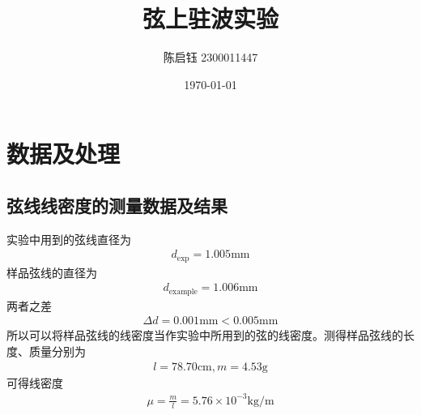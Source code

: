 \documentclass{ctexart}
\title{弦上驻波实验}
\author{陈启钰\,\,2300011447}
\date{\today}
\begin{document}
	\maketitle
	\section{数据及处理}
	\subsection{弦线线密度的测量数据及结果}
	实验中用到的弦线直径为
	\begin{align}
		d_\text{exp}=1.005\mathrm{mm}
	\end{align}
	样品弦线的直径为
	\begin{align}
		d_\text{example}=1.006\mathrm{mm}
	\end{align}
	两者之差
	\begin{align}
		\Delta d=0.001\mathrm{mm}<0.005\mathrm{mm}
	\end{align}
	所以可以将样品弦线的线密度当作实验中所用到的弦的线密度。测得样品弦线的长度、质量分别为
	\begin{align}
		l=78.70\mathrm{cm}, m=4.53\mathrm{g}
	\end{align}
	可得线密度
	\begin{align}
		\mu = \frac{m}{l}=5.76\times 10^{-3}\mathrm{kg/m}
	\end{align}
\end{document}
